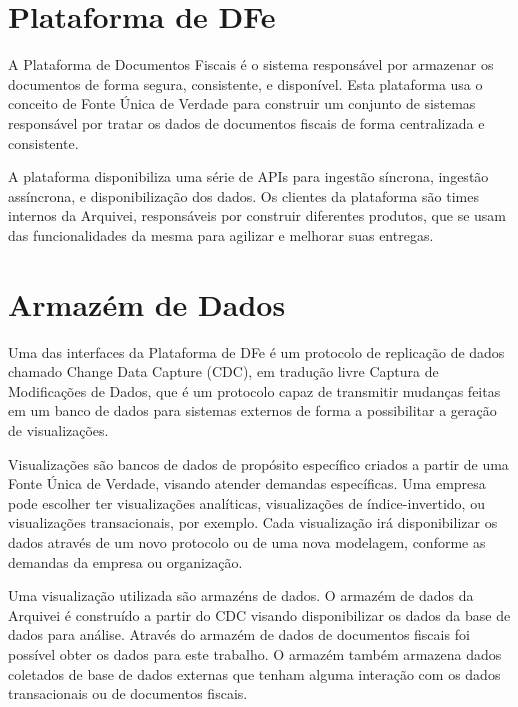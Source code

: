 \section{Plataforma de DFe}

A Plataforma de Documentos Fiscais é o sistema responsável por armazenar os documentos de forma segura, consistente, e disponível. Esta plataforma usa o conceito de Fonte Única de Verdade para construir um conjunto de sistemas responsável por tratar os dados de documentos fiscais de forma centralizada e consistente.

A plataforma disponibiliza uma série de APIs para ingestão síncrona, ingestão assíncrona, e disponibilização dos dados. Os clientes da plataforma são times internos da Arquivei, responsáveis por construir diferentes produtos, que se usam das funcionalidades da mesma para agilizar e melhorar suas entregas.

\section{Armazém de Dados}

Uma das interfaces da Plataforma de DFe é um protocolo de replicação de dados chamado Change Data Capture (CDC), em tradução livre Captura de Modificações de Dados, que é um protocolo capaz de transmitir mudanças feitas em um banco de dados para sistemas externos de forma a possibilitar a geração de visualizações.

Visualizações são bancos de dados de propósito específico criados a partir de uma Fonte Única de Verdade, visando atender demandas específicas. Uma empresa pode escolher ter visualizações analíticas, visualizações de índice-invertido, ou visualizações transacionais, por exemplo. Cada visualização irá disponibilizar os dados através de um novo protocolo ou de uma nova modelagem, conforme as demandas da empresa ou organização.

Uma visualização utilizada são armazéns de dados. O armazém de dados da Arquivei é construído a partir do CDC visando disponibilizar os dados da base de dados para análise. Através do armazém de dados de documentos fiscais foi possível obter os dados para este trabalho. O armazém também armazena dados coletados de base de dados externas que tenham alguma interação com os dados transacionais ou de documentos fiscais.
